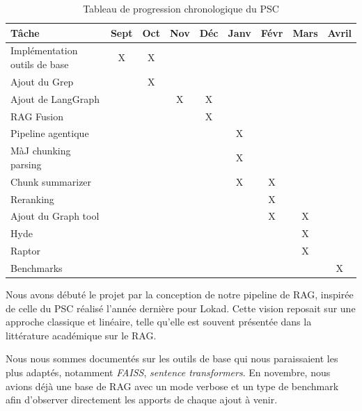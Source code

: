 \renewcommand{\arraystretch}{1.5} %
\begin{table}[h]
\centering
\begin{tabular}{|l|c|c|c|c|c|c|c|c|}
\hline
\rowcolor{gray!20} \textbf{Tâche} & \textbf{Sept} & \textbf{Oct} & \textbf{Nov} & \textbf{Déc} & \textbf{Janv} & \textbf{Févr} & \textbf{Mars} & \textbf{Avril} \\ \hline
Implémentation outils de base & \cellcolor{gray!50}X & \cellcolor{gray!50}X & & & & & & \\ \hline
Ajout du Grep & & \cellcolor{gray!50}X & & & & & & \\ \hline
Ajout de LangGraph & & & \cellcolor{gray!50}X & \cellcolor{gray!50}X & & & & \\ \hline
RAG Fusion & & & & \cellcolor{gray!50}X & & & & \\ \hline
Pipeline agentique & & & & & \cellcolor{gray!50}X & & & \\ \hline
MàJ chunking parsing & & & & & \cellcolor{gray!50}X & & & \\ \hline
Chunk summarizer & & & & & \cellcolor{gray!50}X & \cellcolor{gray!50}X & & \\ \hline
Reranking & & & & & & \cellcolor{gray!50}X & & \\ \hline
Ajout du Graph tool & & & & & & \cellcolor{gray!50}X & \cellcolor{gray!50}X & \\ \hline
Hyde & & & & & & & \cellcolor{gray!50}X & \\ \hline
Raptor & & & & & & & \cellcolor{gray!50}X & \\ \hline
Benchmarks & & & & & & & & \cellcolor{gray!50}X \\ \hline
\end{tabular}
\caption{Tableau de progression chronologique du PSC}
\end{table}

Nous avons débuté le projet par la conception de notre pipeline de RAG, inspirée de celle du PSC réalisé l’année dernière pour Lokad. Cette vision reposait sur une approche classique et linéaire, telle qu'elle est souvent présentée dans la littérature académique sur le RAG.

Nous nous sommes documentés sur les outils de base qui nous paraissaient les plus adaptés, notamment \textit{FAISS}, \textit{sentence transformers}.
En novembre, nous avions déjà une base de RAG avec un mode verbose et un type de benchmark afin d’observer directement les apports de chaque ajout à venir.

